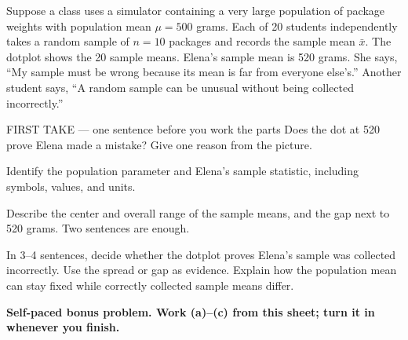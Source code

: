 \documentclass[14pt]{extarticle}
\begin{document}
\pagestyle{empty}


\noindent\begin{minipage}[t]{0.57\linewidth}
\vspace{0pt}
Suppose a class uses a simulator containing a very large population of package weights with population mean $\mu=500$ grams. Each of 20 students independently takes a random sample of $n=10$ packages and records the sample mean $\bar{x}$. The dotplot shows the 20 sample means. Elena's sample mean is 520 grams. She says, ``My sample must be wrong because its mean is far from everyone else's.'' Another student says, ``A random sample can be unusual without being collected incorrectly.''\par
\end{minipage}\hfill
\begin{minipage}[t]{0.40\linewidth}
\vspace{0pt}
\begin{center}
\end{center}
\end{minipage}

\begin{firsttakebox}{FIRST TAKE --- one sentence before you work the parts}
Does the dot at 520 prove Elena made a mistake? Give one reason from the picture.
\end{firsttakebox}

\begin{description}[leftmargin=1.15in, labelwidth=1in, itemsep=2pt, topsep=2pt]
  \item[\dokbadge{1}~(a)] Identify the population parameter and Elena's sample statistic, including symbols, values, and units.
  \item[\dokbadge{2}~(b)] Describe the center and overall range of the sample means, and the gap next to 520 grams. Two sentences are enough.
  \item[\dokbadge{3}~(c)] In 3--4 sentences, decide whether the dotplot proves Elena's sample was collected incorrectly. Use the spread or gap as evidence. Explain how the population mean can stay fixed while correctly collected sample means differ.
\end{description}

\vfill
\textbf{Self-paced bonus problem. Work (a)--(c) from this sheet; turn it in whenever you finish.}
\end{document}
